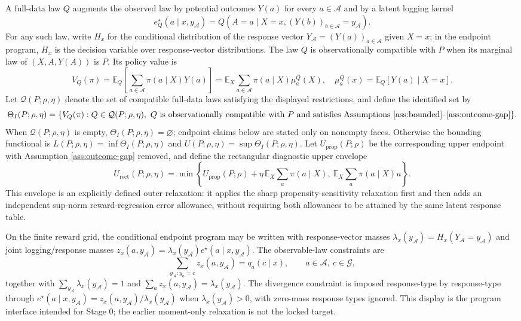 \documentclass[11pt]{article}
\newcommand{\E}{\mathbb{E}}
\theoremstyle{definition}
\theoremstyle{plain}
\theoremstyle{remark}
\begin{document}
A full-data law $Q$ augments the observed law by potential outcomes $Y(a)$ for every $a\in\mathcal{A}$ and by a latent logging kernel
\[
  e_Q^\star(a\mid x,y_{\mathcal A})=Q(A=a\mid X=x,(Y(b))_{b\in\mathcal A}=y_{\mathcal A}).
\]
For any such law, write $H_x$ for the conditional distribution of the response vector
$Y_{\mathcal A}=(Y(a))_{a\in\mathcal A}$ given $X=x$; in the endpoint program, $H_x$ is the decision variable over response-vector distributions.
The law $Q$ is observationally compatible with $P$ when its marginal law of $(X,A,Y(A))$ is $P$. Its policy value is
\[
  V_Q(\pi)=\E_Q\left[\sum_{a\in\mathcal A}\pi(a\mid X)Y(a)\right]
          =\E_X\sum_{a\in\mathcal A}\pi(a\mid X)\mu_a^Q(X),
  \quad \mu_a^Q(x)=\E_Q[Y(a)\mid X=x].
\]
Let $\mathcal Q(P;\rho,\eta)$ denote the set of compatible full-data laws satisfying the displayed restrictions, and define the identified set by
\[
  \Theta_I(P;\rho,\eta)=\{V_Q(\pi): Q\in\mathcal Q(P;\rho,\eta),\ Q \text{ is observationally compatible with } P
       \text{ and satisfies Assumptions \ref{ass:bounded}--\ref{ass:outcome-gap}}\}.
\]
When $\mathcal Q(P;\rho,\eta)$ is empty, $\Theta_I(P;\rho,\eta)=\varnothing$; endpoint claims below are stated only on nonempty faces. Otherwise the bounding functional is $L(P;\rho,\eta)=\inf\Theta_I(P;\rho,\eta)$ and
$U(P;\rho,\eta)=\sup\Theta_I(P;\rho,\eta)$. Let $U_{\mathrm{prop}}(P;\rho)$ be the corresponding upper endpoint with Assumption \ref{ass:outcome-gap} removed, and define the rectangular diagnostic upper envelope
\[
  U_{\mathrm{rect}}(P;\rho,\eta)
  =\min\left\{
      U_{\mathrm{prop}}(P;\rho)+\eta\,\E_X\sum_a\pi(a\mid X),\
      \E_X\sum_a\pi(a\mid X)u
    \right\}.
\]
This envelope is an explicitly defined outer relaxation: it applies the sharp propensity-sensitivity relaxation first and then adds an independent sup-norm reward-regression error allowance, without requiring both allowances to be attained by the same latent response table.

On the finite reward grid, the conditional endpoint program may be written with response-vector masses
$\lambda_x(y_{\mathcal A})=H_x(Y_{\mathcal A}=y_{\mathcal A})$ and joint logging/response masses
$z_x(a,y_{\mathcal A})=\lambda_x(y_{\mathcal A})e^\star(a\mid x,y_{\mathcal A})$. The observable-law constraints are
\[
  \sum_{y_{\mathcal A}:y_a=c} z_x(a,y_{\mathcal A}) = q_a(c\mid x),
  \qquad a\in\mathcal A,\ c\in\mathcal G,
\]
together with $\sum_{y_{\mathcal A}}\lambda_x(y_{\mathcal A})=1$ and
$\sum_a z_x(a,y_{\mathcal A})=\lambda_x(y_{\mathcal A})$. The divergence constraint is imposed response-type by response-type through
$e^\star(a\mid x,y_{\mathcal A})=z_x(a,y_{\mathcal A})/\lambda_x(y_{\mathcal A})$ when $\lambda_x(y_{\mathcal A})>0$, with zero-mass response types ignored. This display is the program interface intended for Stage 0; the earlier moment-only relaxation is not the locked target.
\end{document}
